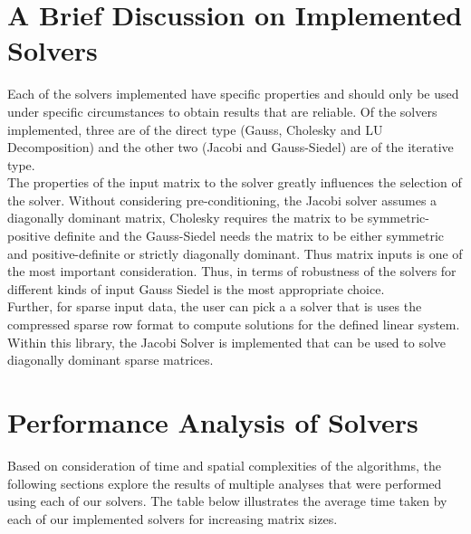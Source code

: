 \documentclass[twoside,twocolumn]{article}
\begin{document}
\section{A Brief Discussion on Implemented Solvers }
Each of the solvers implemented have specific properties and should only be used under specific circumstances to obtain results that are reliable. 
Of the solvers implemented, three are of the direct type (Gauss, Cholesky and LU Decomposition) and the other two (Jacobi and Gauss-Siedel) are of the iterative type. \\
The properties of the input matrix to the solver greatly influences the selection of the solver. Without considering pre-conditioning, the Jacobi solver assumes a diagonally dominant matrix, Cholesky requires the matrix to be symmetric-positive definite and the Gauss-Siedel needs the matrix to be either symmetric and positive-definite or strictly diagonally dominant. Thus matrix inputs is one of the most important consideration. Thus, in terms of robustness of the solvers for different kinds of input Gauss Siedel is the most appropriate choice.\\
Further, for sparse input data, the user can pick a a solver that is uses the compressed sparse row format to compute solutions for the defined linear system. Within this library, the Jacobi Solver is implemented that can be used to solve diagonally dominant sparse matrices.\\

\section{Performance Analysis of Solvers}
Based on consideration of time and spatial complexities of the algorithms, the following sections explore the results of multiple analyses that were performed using each of our solvers. The table below illustrates the average time taken by each of our implemented solvers for increasing matrix sizes. 

\begin{table}[H]
\caption{Absolute Error in Implemented Solvers}
\label{tab:my-table}
\end{table}
\end{document}

